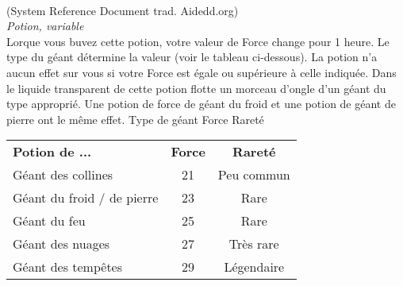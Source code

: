 \\
{\small (System Reference Document trad. Aidedd.org)}\\
{\small \it Potion, variable}\\
Lorque vous buvez cette potion, votre valeur de Force change pour 1 heure. Le type du géant détermine la valeur (voir le tableau ci-dessous). La potion n'a aucun effet sur vous si votre Force est égale ou supérieure à celle indiquée.
Dans le liquide transparent de cette potion flotte un morceau d'ongle d'un géant du type approprié. Une potion de force de géant du froid et une potion de géant de pierre ont le même effet.
Type de géant Force Rareté
\begin{center}
\setlength{\tabcolsep}{4pt}
\begin{tabular}{lcc}
\bf Potion de ...  & \bf Force & \bf Rareté \\
   \rowcolor{LightCyan}
Géant des collines & 21 & Peu commun \\
Géant du froid / de pierre & 23 & Rare \\
   \rowcolor{LightCyan}
Géant du feu & 25 & Rare \\
Géant des nuages & 27 & Très rare \\
   \rowcolor{LightCyan}
Géant des tempêtes & 29 & Légendaire \\
\end{tabular}
\end{center}

